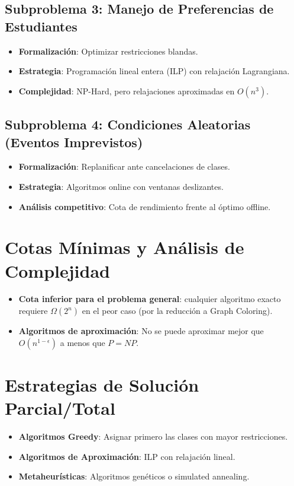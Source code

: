 \documentclass[12pt, a4paper]{article}
\begin{document}
\subsection{Subproblema 3: Manejo de Preferencias de Estudiantes}
\begin{itemize}
    \item \textbf{Formalización}: Optimizar restricciones blandas.
    \item \textbf{Estrategia}: Programación lineal entera (ILP) con relajación Lagrangiana.
    \item \textbf{Complejidad}: NP-Hard, pero relajaciones aproximadas en \( O(n^3) \).
\end{itemize}

\subsection{Subproblema 4: Condiciones Aleatorias (Eventos Imprevistos)}
\begin{itemize}
    \item \textbf{Formalización}: Replanificar ante cancelaciones de clases.
    \item \textbf{Estrategia}: Algoritmos online con ventanas deslizantes.
    \item \textbf{Análisis competitivo}: Cota de rendimiento frente al óptimo offline.
\end{itemize}

\section{Cotas Mínimas y Análisis de Complejidad}
\begin{itemize}
    \item \textbf{Cota inferior para el problema general}: cualquier algoritmo exacto requiere \( \Omega(2^n) \) en el peor caso (por la reducción a Graph Coloring).
    \item \textbf{Algoritmos de aproximación}: No se puede aproximar mejor que \( O(n^{1-\epsilon}) \) a menos que \( P = NP \).
\end{itemize}

\section{Estrategias de Solución Parcial/Total}
\begin{itemize}
    \item \textbf{Algoritmos Greedy}: Asignar primero las clases con mayor restricciones.
    \item \textbf{Algoritmos de Aproximación}: ILP con relajación lineal.
    \item \textbf{Metaheurísticas}: Algoritmos genéticos o simulated annealing.
\end{itemize}
\end{document}
